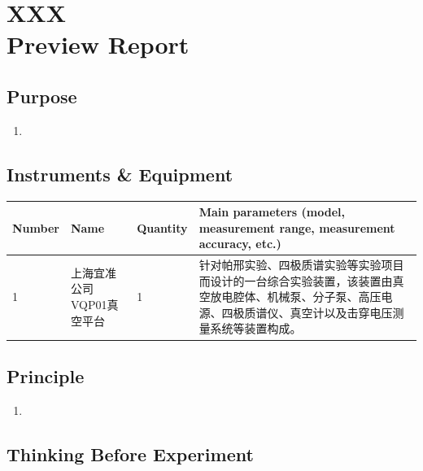
\setcounter{section}{0}
\section{XXX \\ Preview Report}


\subsection{Purpose}
\begin{enumerate}
	\item 
\end{enumerate}


\subsection{Instruments \& Equipment}
\begin{table}[htbp]
	\centering
	\renewcommand\arraystretch{1.6}
	\begin{tabular}{|p{}|p{}|p{}|p{}|}
		\hline
		Number & Name & Quantity & Main parameters (model, measurement range, measurement accuracy, etc.) \\
		\hline
		1 & 上海宜准公司VQP01真空平台 & 1 & 针对帕邢实验、四极质谱实验等实验项目而设计的一台综合实验装置，该装置由真空放电腔体、机械泵、分子泵、高压电源、四极质谱仪、真空计以及击穿电压测量系统等装置构成。 \\
		\hline
	\end{tabular}
\end{table}


\subsection{Principle}
\begin{enumerate}
	\item 
\end{enumerate}


\subsection{Thinking Before Experiment}

